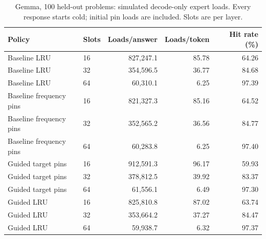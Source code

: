 \begin{table}[ht]
\centering\small
\caption{Gemma, 100 held-out problems: simulated decode-only expert loads. Every response starts cold; initial pin loads are included. Slots are per layer.}
\label{tab:gemma-cache-100-loads}
\begin{tabular}{llrrr}
\toprule
Policy & Slots & Loads/answer & Loads/token & Hit rate (\%) \\
\midrule
Baseline LRU & 16 & 827,247.1 & 85.78 & 64.26 \\
Baseline LRU & 32 & 354,596.5 & 36.77 & 84.68 \\
Baseline LRU & 64 & 60,310.1 & 6.25 & 97.39 \\
Baseline frequency pins & 16 & 821,327.3 & 85.16 & 64.52 \\
Baseline frequency pins & 32 & 352,565.2 & 36.56 & 84.77 \\
Baseline frequency pins & 64 & 60,283.8 & 6.25 & 97.40 \\
Guided target pins & 16 & 912,591.3 & 96.17 & 59.93 \\
Guided target pins & 32 & 378,812.5 & 39.92 & 83.37 \\
Guided target pins & 64 & 61,556.1 & 6.49 & 97.30 \\
Guided LRU & 16 & 825,810.8 & 87.02 & 63.74 \\
Guided LRU & 32 & 353,664.2 & 37.27 & 84.47 \\
Guided LRU & 64 & 59,938.7 & 6.32 & 97.37 \\
\bottomrule
\end{tabular}
\end{table}
